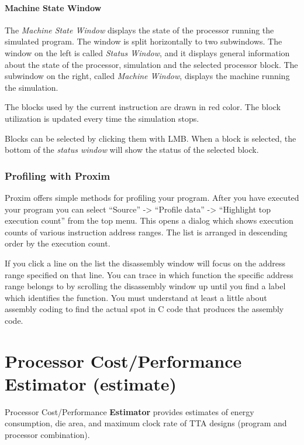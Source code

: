 \documentclass[twoside]{tceusermanual}
\begin{document}
\paragraph{Machine State Window}

The \emph{Machine State Window}
displays the state of the processor running the simulated program.
The window is split horizontally to two subwindows. The window on the
left is called \emph{Status Window}, and it displays general information
about the state of the processor, simulation and the selected processor
block. The subwindow on the right, called \emph{Machine Window},
displays the machine running the simulation.

The blocks used by the current instruction are drawn in red color. The block
utilization is updated every time the simulation stops.

Blocks can be selected by clicking them with LMB.
When a block is selected, the bottom of the \emph{status window}
will show the status of the selected block.

\subsubsection{Profiling with Proxim}
\label{sec:ProfileProxim}

Proxim offers simple methods for profiling your program. After you have
executed your program you can select ``Source'' -> ``Profile data'' ->
``Highlight top execution count'' from the top menu. This opens a dialog which
shows execution counts of various instruction address ranges. The list is
arranged in descending order by the execution count.

If you click a line on the list the disassembly window will focus on the
address range specified on that line. You can trace in which function the
specific address range belongs to by scrolling the disassembly window up
until you find a label which identifies the function. You must understand at
least a little about assembly coding to find the actual spot in C code that
produces the assembly code.

\section{Processor Cost/Performance Estimator (estimate)}
\label{section:estimate}

Processor Cost/Performance \textbf{Estimator} provides estimates of energy
consumption, die area, and maximum clock rate of TTA designs (program and
processor combination).
\end{document}

